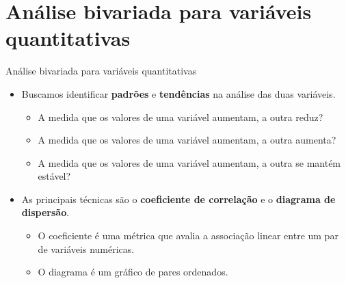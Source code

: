 \documentclass[
  ignorenonframetext,
  serif,
  professionalfont,
  usenames,
  dvipsnames,
  aspectratio = 169]{beamer}
\providecommand{\tightlist}{%
  \setlength{\itemsep}{0pt}\setlength{\parskip}{0pt}}
\renewcommand{\tightlist}{%
  \setlength{\itemsep}{0\baselineskip}
  \setlength{\parskip}{0.25\baselineskip}
}
\def\beginAHalfColumn{\begin{minipage}{0.49\textwidth}}%
\def\endColumns{\end{minipage}}%
\begin{document}
\hypertarget{anuxe1lise-bivariada-para-variuxe1veis-quantitativas}{%
\section{Análise bivariada para variáveis
quantitativas}\label{anuxe1lise-bivariada-para-variuxe1veis-quantitativas}}

\begin{frame}{Análise bivariada para variáveis quantitativas}
\protect\hypertarget{anuxe1lise-bivariada-para-variuxe1veis-quantitativas-1}{}
\beginAHalfColumn

\begin{itemize}
\tightlist
\item
  Buscamos identificar \textbf{padrões} e \textbf{tendências} na análise
  das duas variáveis.

  \begin{itemize}
  \tightlist
  \item
    A medida que os valores de uma variável aumentam, a outra reduz?
  \item
    A medida que os valores de uma variável aumentam, a outra aumenta?
  \item
    A medida que os valores de uma variável aumentam, a outra se mantém
    estável?
  \end{itemize}
\end{itemize}

\endColumns
\beginAHalfColumn

\begin{itemize}
\tightlist
\item
  As principais técnicas são o \textbf{coeficiente de correlação} e o
  \textbf{diagrama de dispersão}.

  \begin{itemize}
  \tightlist
  \item
    O coeficiente é uma métrica que avalia a associação linear entre um
    par de variáveis numéricas.
  \item
    O diagrama é um gráfico de pares ordenados.
  \end{itemize}
\end{itemize}

\endColumns
\end{frame}
\end{document}
